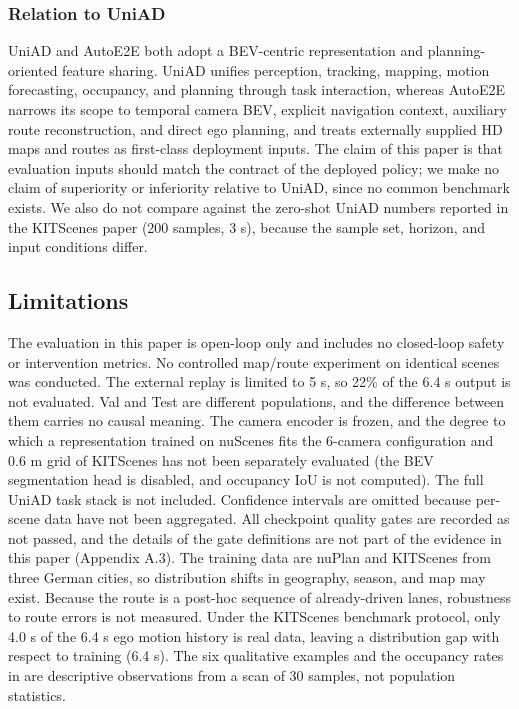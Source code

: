 \documentclass[
  english,
  10pt,
]{article}
\begin{document}
\subsubsection{Relation to UniAD}\label{relation-to-uniad}

UniAD and AutoE2E both adopt a BEV-centric representation and
planning-oriented feature sharing. UniAD unifies perception, tracking,
mapping, motion forecasting, occupancy, and planning through task
interaction, whereas AutoE2E narrows its scope to temporal camera BEV,
explicit navigation context, auxiliary route reconstruction, and direct
ego planning, and treats externally supplied HD maps and routes as
first-class deployment inputs. The claim of this paper is that
evaluation inputs should match the contract of the deployed policy; we
make no claim of superiority or inferiority relative to UniAD, since no
common benchmark exists. We also do not compare against the zero-shot
UniAD numbers reported in the KITScenes paper (200 samples, 3 s),
because the sample set, horizon, and input conditions differ.

\subsection{Limitations}\label{limitations}

The evaluation in this paper is open-loop only and includes no
closed-loop safety or intervention metrics. No controlled map/route
experiment on identical scenes was conducted. The external replay is
limited to 5 s, so 22\% of the 6.4 s output is not evaluated. Val and
Test are different populations, and the difference between them carries
no causal meaning. The camera encoder is frozen, and the degree to which
a representation trained on nuScenes fits the 6-camera configuration and
0.6 m grid of KITScenes has not been separately evaluated (the BEV
segmentation head is disabled, and occupancy IoU is not computed). The
full UniAD task stack is not included. Confidence intervals are omitted
because per-scene data have not been aggregated. All checkpoint quality
gates are recorded as not passed, and the details of the gate
definitions are not part of the evidence in this paper (Appendix A.3).
The training data are nuPlan and KITScenes from three German cities, so
distribution shifts in geography, season, and map may exist. Because the
route is a post-hoc sequence of already-driven lanes, robustness to
route errors is not measured. Under the KITScenes benchmark protocol,
only 4.0 s of the 6.4 s ego motion history is real data, leaving a
distribution gap with respect to training (6.4 s). The six qualitative
examples and the occupancy rates in \hyperref[tab-channels]{}are
descriptive observations from a scan of 30 samples, not population
statistics.
\end{document}
